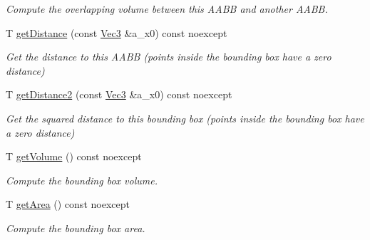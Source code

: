 \begin{DoxyCompactItemize}
\begin{DoxyCompactList}\small\item\em Compute the overlapping volume between this A\+A\+BB and another A\+A\+BB. \end{DoxyCompactList}\item 
T \hyperlink{classEBGeometry_1_1BoundingVolumes_1_1AABBT_ad751f30ffaef31c0afb66d5d401bbb8f}{get\+Distance} (const \hyperlink{classEBGeometry_1_1BoundingVolumes_1_1AABBT_af139f618de2c5138990a63e93eb7d066}{Vec3} \&a\+\_\+x0) const noexcept
\begin{DoxyCompactList}\small\item\em Get the distance to this A\+A\+BB (points inside the bounding box have a zero distance) \end{DoxyCompactList}\item 
T \hyperlink{classEBGeometry_1_1BoundingVolumes_1_1AABBT_a14091ab693c3389b88cad60d68116848}{get\+Distance2} (const \hyperlink{classEBGeometry_1_1BoundingVolumes_1_1AABBT_af139f618de2c5138990a63e93eb7d066}{Vec3} \&a\+\_\+x0) const noexcept
\begin{DoxyCompactList}\small\item\em Get the squared distance to this bounding box (points inside the bounding box have a zero distance) \end{DoxyCompactList}\item 
\mbox{\label{classEBGeometry_1_1BoundingVolumes_1_1AABBT_a5f52d6e7087d892d347c0c17dac3de53}} 
T \hyperlink{classEBGeometry_1_1BoundingVolumes_1_1AABBT_a5f52d6e7087d892d347c0c17dac3de53}{get\+Volume} () const noexcept
\begin{DoxyCompactList}\small\item\em Compute the bounding box volume. \end{DoxyCompactList}\item 
\mbox{\label{classEBGeometry_1_1BoundingVolumes_1_1AABBT_ac733727761633341cb27db022185cba7}} 
T \hyperlink{classEBGeometry_1_1BoundingVolumes_1_1AABBT_ac733727761633341cb27db022185cba7}{get\+Area} () const noexcept
\begin{DoxyCompactList}\small\item\em Compute the bounding box area. \end{DoxyCompactList}\item 
\mbox{\label{classEBGeometry_1_1BoundingVolumes_1_1AABBT_a9ae0e966236d98938696fbf6482d56ec}} 

\end{DoxyCompactItemize}
